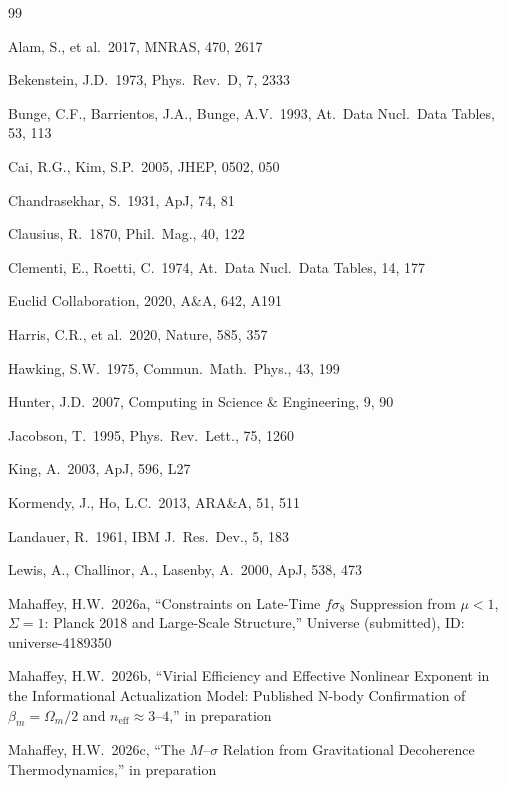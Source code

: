 \documentclass[12pt,a4paper]{article}
\begin{document}
\begin{thebibliography}{99}

 Alam, S., et al.\ 2017, MNRAS, 470, 2617

 Bekenstein, J.D.\ 1973, Phys.\ Rev.\ D, 7, 2333

 Bunge, C.F., Barrientos, J.A., Bunge, A.V.\ 1993, At.\ Data Nucl.\ Data Tables, 53, 113

 Cai, R.G., Kim, S.P.\ 2005, JHEP, 0502, 050

 Chandrasekhar, S.\ 1931, ApJ, 74, 81

 Clausius, R.\ 1870, Phil.\ Mag., 40, 122

 Clementi, E., Roetti, C.\ 1974, At.\ Data Nucl.\ Data Tables, 14, 177

 Euclid Collaboration, 2020, A\&A, 642, A191

 Harris, C.R., et al.\ 2020, Nature, 585, 357

 Hawking, S.W.\ 1975, Commun.\ Math.\ Phys., 43, 199

 Hunter, J.D.\ 2007, Computing in Science \& Engineering, 9, 90

 Jacobson, T.\ 1995, Phys.\ Rev.\ Lett., 75, 1260

 King, A.\ 2003, ApJ, 596, L27

 Kormendy, J., Ho, L.C.\ 2013, ARA\&A, 51, 511

 Landauer, R.\ 1961, IBM J.\ Res.\ Dev., 5, 183

 Lewis, A., Challinor, A., Lasenby, A.\ 2000, ApJ, 538, 473

 Mahaffey, H.W.\ 2026a, ``Constraints on Late-Time
$f\sigma_8$ Suppression from $\mu < 1$, $\Sigma = 1$: Planck 2018 and
Large-Scale Structure,'' Universe (submitted), ID: universe-4189350

 Mahaffey, H.W.\ 2026b, ``Virial Efficiency and Effective
Nonlinear Exponent in the Informational Actualization Model: Published N-body
Confirmation of $\beta_m = \Omega_m/2$ and $n_\mathrm{eff} \approx 3$--$4$,''
in preparation

 Mahaffey, H.W.\ 2026c, ``The $M$--$\sigma$ Relation from
Gravitational Decoherence Thermodynamics,'' in preparation


\end{thebibliography}
\end{document}
